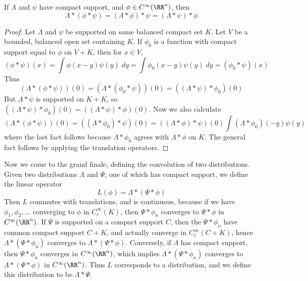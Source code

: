 \begin{theorem}
    If $\Lambda$ and $\psi$ have compact support, and $\phi \in C^\infty(\RR^n)$, then
    \[ \Lambda * (\phi * \psi) = (\Lambda * \phi) * \psi = (\Lambda * \psi) * \phi \]
\end{theorem}
\begin{proof}
    Let $\Lambda$ and $\psi$ be supported on some balanced compact set $K$. Let $V$ be a bounded, balanced open set containing $K$. If $\phi_0$ is a function with compact support equal to $\phi$ on $V + K$, then for $x \in V$,
    \[ (\phi * \psi)(x) = \int \phi(x - y) \psi(y)\; dy = \int \phi_0(x - y) \psi(y)\; dy = (\phi_0 * \psi)(x) \]
    Thus
    \[ (\Lambda * (\phi * \psi))(0) = (\Lambda * (\phi_0 * \psi))(0) = ((\Lambda * \psi) * \phi_0)(0) \]
    But $\Lambda * \psi$ is supported on $K + K$, so $((\Lambda * \psi) * \phi_0)(0) = ((\Lambda * \psi) * \phi)(0)$. Now we also calculate
    \[ (\Lambda * (\phi * \psi))(0) = ((\Lambda * \phi_0) * \psi)(0) = ((\Lambda * \phi) * \psi)(0) \int (\Lambda * \phi_0)(-y) \psi(y) \]
    where the last fact follows because $\Lambda * \phi_0$ agrees with $\Lambda * \phi$ on $K$. The general fact follows by applying the translation operators.
\end{proof}

Now we come to the grand finale, defining the convolution of two distributions. Given two distributions $\Lambda$ and $\Psi$, one of which has compact support, we define the linear operator
%
\[ L(\phi) = \Lambda * (\Psi * \phi) \]
%
Then $L$ commutes with translations, and is continuous, because if we have $\phi_1, \phi_2, \dots$ converging to $\phi$ in $C_c^\infty(K)$, then $\Psi * \phi_n$ converges to $\Psi * \phi$ in $C^\infty(\RR^n)$. If $\Psi$ is supported on a compact support $C$, then the $\Psi * \phi_n$ have common compact support $C + K$, and actually converge in $C_c^\infty(C + K)$, hence $\Lambda * (\Psi * \phi_n)$ converges to $\Lambda * (\Psi * \phi)$. Conversely, if $\Lambda$ has compact support, then $\Psi * \phi_n$ converges in $C^\infty(\RR^n)$, which implies $\Lambda * (\Psi * \phi_n)$ converges to $\Lambda * (\Psi * \phi)$ in $C^\infty(\RR^n)$. Thus $L$ corresponds to a distribution, and we define this distribution to be $\Lambda * \Psi$.

